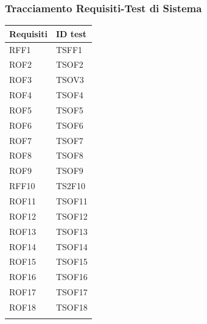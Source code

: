 \documentclass[../PianoDiQualifica_v4.0.0.tex]{subfiles}
\begin{document}
	\subsubsection{Tracciamento Requisiti-Test di Sistema}
	\begin{longtable}[c] { >{\centering\arraybackslash}p{3cm} >{\centering\arraybackslash}p{3cm}}
		\toprule
		\centerline{\textbf{Requisiti}} & \centerline{\textbf{ID test}} \\
			\midrule
			RFF1 & TSFF1 \\
			\addlinespace[0.3em]
			\midrule
			\addlinespace[0.3em]
			ROF2 & TSOF2 \\
			\addlinespace[0.3em]
			\midrule
			\addlinespace[0.3em]
			ROF3 & TSOV3 \\
			\addlinespace[0.3em]
			\midrule
			\addlinespace[0.3em]
			ROF4 & TSOF4 \\
			\addlinespace[0.3em]
			\midrule
			\addlinespace[0.3em]
			ROF5 & TSOF5 \\
			\addlinespace[0.3em]
			\midrule
			\addlinespace[0.3em]
			ROF6 & TSOF6 \\
			\addlinespace[0.3em]
			\midrule
			\addlinespace[0.3em]
			ROF7 & TSOF7 \\
			\addlinespace[0.3em]
			\midrule
			\addlinespace[0.3em]
			ROF8 & TSOF8 \\
			\addlinespace[0.3em]
			\midrule
			\addlinespace[0.3em]
			ROF9 & TSOF9 \\
			\addlinespace[0.3em]
			\midrule
			\addlinespace[0.3em]
			RFF10 & TS2F10 \\
			\addlinespace[0.3em]
			\midrule
			\addlinespace[0.3em]
			ROF11 & TSOF11 \\
			\addlinespace[0.3em]
			\midrule
			\addlinespace[0.3em]
			ROF12 & TSOF12 \\
			\addlinespace[0.3em]
			\midrule
			\addlinespace[0.3em]
			ROF13 & TSOF13 \\
			\addlinespace[0.3em]
			\midrule
			\addlinespace[0.3em]
			ROF14 & TSOF14 \\
			\addlinespace[0.3em]
			\midrule
			\addlinespace[0.3em]
			ROF15 & TSOF15 \\
			\addlinespace[0.3em]
			\midrule
			\addlinespace[0.3em]
			ROF16 & TSOF16 \\
			\addlinespace[0.3em]
			\midrule
			\addlinespace[0.3em]
			ROF17 & TSOF17 \\
			\addlinespace[0.3em]
			\midrule
			\addlinespace[0.3em]
			ROF18 & TSOF18 \\
			\addlinespace[0.3em]

\end{longtable}
\end{document}

